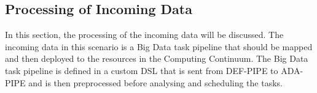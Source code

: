 \documentclass{article}
\begin{document}
            


        \subsection{Processing of Incoming Data}
        \label{sec:processing-of-data-server}

            In this section, the processing of the incoming data will be discussed.
            The incoming data in this scenario is a Big Data task pipeline that should be mapped and then deployed to the resources in the Computing Continuum. The Big Data task pipeline is defined in a custom DSL \cite{mehranDSLDEFPIPEExample2023} that is sent from DEF-PIPE to ADA-PIPE and is then preprocessed before analysing and scheduling the tasks. 
\end{document}
